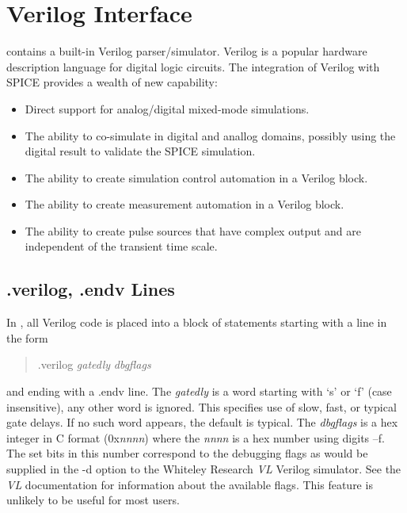 \section{Verilog Interface}


{\WRspice} contains a built-in Verilog parser/simulator.  Verilog is a
popular hardware description language for digital logic circuits.  The
integration of Verilog with SPICE provides a wealth of new capability:
\begin{itemize}
\item{Direct support for analog/digital mixed-mode simulations.}
\item{The ability to co-simulate in digital and anallog domains,
possibly using the digital result to validate the SPICE simulation.}
\item{The ability to create simulation control automation in a
        Verilog block.}
\item{The ability to create measurement automation in a Verilog
        block.}
\item{The ability to create pulse sources that have complex output
        and are independent of the transient time scale.}
\end{itemize}

\subsection{{\vt .verilog}, {\vt .endv}  Lines}
In {\WRspice}, all Verilog code is placed into a block of statements
starting with a line in the form
\begin{quote}
{\vt .verilog} {\it gatedly} {\it dbgflags}
\end{quote}
and ending with a {\vt .endv} line.  The {\it gatedly} is a word
starting with `{\vt s}' or `{\vt f}' (case insensitive), any other
word is ignored.  This specifies use of slow, fast, or typical gate
delays.  If no such word appears, the default is typical.  The {\it
dbgflags} is a hex integer in C format ({\vt 0x}{\it nnnn\/}) where
the {\it nnnn} is a hex number using digits {--f}.  The set bits
in this number correspond to the debugging flags as would be supplied
in the {\vt -d} option to the Whiteley Research {\it VL} Verilog
simulator.  See the {\it VL} documentation for information about the
available flags.  This feature is unlikely to be useful for most
users.

